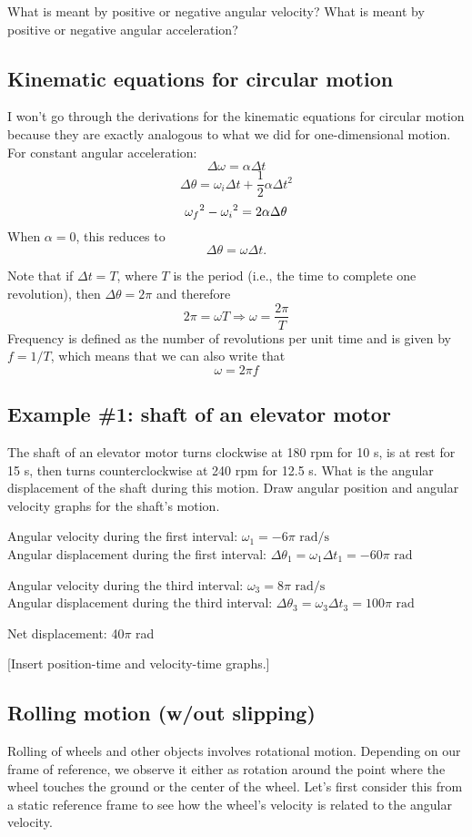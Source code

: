 What is meant by positive or negative angular velocity? What is meant by positive or negative angular acceleration?
 
\subsection{Kinematic equations for circular motion}
I won't go through the derivations for the kinematic equations for circular motion because they are exactly analogous to what we did for one-dimensional motion. For constant angular acceleration:
$$\Delta\omega=\alpha\Delta{t}$$
$$\Delta\theta=\omega_i\Delta{t}+\frac{1}{2}\alpha\Delta{t}^2$$
$$\omega_f\displaystyle^2-\omega_i\displaystyle^2=2\alpha\Delta\theta$$
When $\alpha=0$, this reduces to
$$\Delta\theta=\omega\Delta{t}.$$

Note that if $\Delta t=T$, where $T$ is the period (i.e., the time to complete one revolution), then $\Delta \theta = 2\pi$ and therefore
$$2\pi = \omega T \Rightarrow \omega = \frac{2\pi}{T}$$
Frequency is defined as the number of revolutions per unit time and is given by $f=1/T$, which means that we can also write that
$$\omega = 2\pi f$$

\subsection{Example \#1: shaft of an elevator motor}
The shaft of an elevator motor turns clockwise at 180 rpm for 10 s, is at rest for 15 s, then turns counterclockwise at 240 rpm for 12.5 s. What is the angular displacement of the shaft during this motion. Draw angular position and angular velocity graphs for the shaft's motion.

Angular velocity during the first interval: $\omega_1=-6\pi\mbox{ rad/s}$\\
Angular displacement during the first interval: $\Delta\theta_1=\omega_1\Delta{t_1}=-60\pi\mbox{ rad}$

Angular velocity during the third interval: $\omega_3=8\pi\mbox{ rad/s}$\\
Angular displacement during the third interval: $\Delta\theta_3=\omega_3\Delta{t_3}=100\pi\mbox{ rad}$

Net displacement: 40$\pi$ rad

[Insert position-time and velocity-time graphs.]

\clearpage
\subsection{Rolling motion (w/out slipping)}
Rolling of wheels and other objects involves rotational motion. Depending on our frame of reference, we observe it either as rotation around the point where the wheel touches the ground or the center of the wheel. Let's first consider this from a static reference frame to see how the wheel's velocity is related to the angular velocity.

